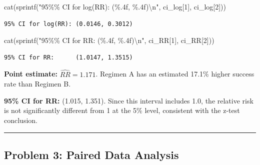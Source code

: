 \documentclass[
  letterpaper,
  DIV=11,
  numbers=noendperiod]{scrartcl}
\newenvironment{Shaded}{\begin{snugshade}}{\end{snugshade}}
\newcommand{\DecValTok}[1]{\textcolor[rgb]{0.68,0.00,0.00}{#1}}
\newcommand{\FunctionTok}[1]{\textcolor[rgb]{0.28,0.35,0.67}{#1}}
\newcommand{\NormalTok}[1]{\textcolor[rgb]{0.00,0.23,0.31}{#1}}
\newcommand{\SpecialCharTok}[1]{\textcolor[rgb]{0.37,0.37,0.37}{#1}}
\newcommand{\StringTok}[1]{\textcolor[rgb]{0.13,0.47,0.30}{#1}}
\begin{document}
\begin{Shaded}
\begin{Highlighting}[]
\FunctionTok{cat}\NormalTok{(}\FunctionTok{sprintf}\NormalTok{(}\StringTok{"95\%\% CI for log(RR): (\%.4f, \%.4f)}\SpecialCharTok{\textbackslash{}n}\StringTok{"}\NormalTok{, ci\_log[}\DecValTok{1}\NormalTok{], ci\_log[}\DecValTok{2}\NormalTok{]))}
\end{Highlighting}
\end{Shaded}

\begin{verbatim}
95% CI for log(RR): (0.0146, 0.3012)
\end{verbatim}

\begin{Shaded}
\begin{Highlighting}[]
\FunctionTok{cat}\NormalTok{(}\FunctionTok{sprintf}\NormalTok{(}\StringTok{"95\%\% CI for RR:      (\%.4f, \%.4f)}\SpecialCharTok{\textbackslash{}n}\StringTok{"}\NormalTok{, ci\_RR[}\DecValTok{1}\NormalTok{],  ci\_RR[}\DecValTok{2}\NormalTok{]))}
\end{Highlighting}
\end{Shaded}

\begin{verbatim}
95% CI for RR:      (1.0147, 1.3515)
\end{verbatim}

\textbf{Point estimate:} \(\widehat{RR} = 1.171\). Regimen A has an
estimated 17.1\% higher success rate than Regimen B.

\textbf{95\% CI for RR:} (1.015, 1.351). Since this interval includes
1.0, the relative risk is not significantly different from 1 at the 5\%
level, consistent with the z-test conclusion.

\begin{center}\rule{0.5\linewidth}{0.5pt}\end{center}

\subsection{Problem 3: Paired Data
Analysis}\label{problem-3-paired-data-analysis}
\end{document}
